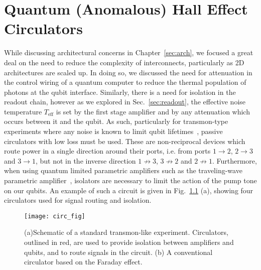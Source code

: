 \chapter{Quantum (Anomalous) Hall Effect Circulators}
\label{sec:hall}

While discussing architectural concerns in Chapter~\ref{sec:arch}, we focused a great deal on the need to reduce the complexity of interconnects,
particularly as 2D architectures are scaled up. In doing so, we discussed the need for attenuation in the control wiring of a quantum computer
to reduce the thermal population of photons at the qubit interface. Similarly, there is a need for isolation in the readout chain, however
as we explored in Sec.~\ref{sec:readout}, the effective noise temperature $T_\textrm{eff}$ is set by the first stage amplifier and by any attenuation
which occurs between it and the qubit. As such, particularly for transmon-type experiments where any noise is known to limit qubit
lifetimes~\cite{PhysRevLett.101.080502}, passive circulators with low loss must be used. These are non-reciprocal devices which route power
in a single direction around their ports, i.e. from ports $1 \to 2$, $2 \to 3$ and $3 \to 1$, but not in the inverse direction $1 \not\to 3$, $3 \not\to 2$
and $2 \not\to 1$. Furthermore, when using quantum limited parametric amplifiers such as the traveling-wave parametric amplifier~\cite{PhysRevLett.113.157001},
isolators are necessary to limit the action of the pump tone on our qubits. An example of such a circuit is given in Fig.~\ref{fig:circfig} (a), showing
four circulators used for signal routing and isolation.

\begin{figure}[tb]
    \texttt{[image: circ\_fig]}
    \caption[Schematic of a standard transmon-like experiment]
    {\label{fig:circfig}(a)Schematic of a standard transmon-like experiment. Circulators, outlined in red, are used to provide isolation between amplifiers and qubits,
    and to route signals in the circuit. (b) A conventional circulator based on the Faraday effect.}
\end{figure}

